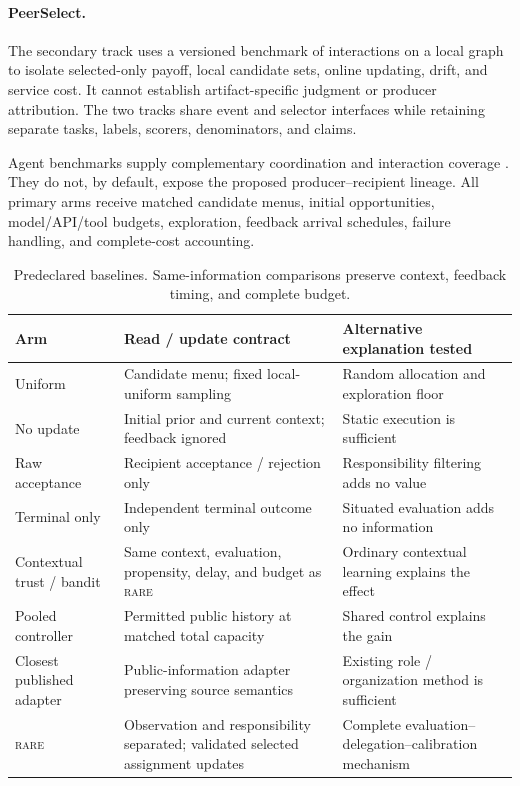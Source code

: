\documentclass[sigconf,anonymous]{aamas}
\newcommand{\rare}{\textsc{rare}}
\begin{document}
\paragraph{PeerSelect.} The secondary track uses a versioned benchmark of interactions on a local graph to isolate selected-only payoff, local candidate sets, online updating, drift, and service cost. It cannot establish artifact-specific judgment or producer attribution. The two tracks share event and selector interfaces while retaining separate tasks, labels, scorers, denominators, and claims.

Agent benchmarks supply complementary coordination and interaction coverage \cite{zhu2025multiagentbench,agashe2025llmcoordination,liu2024agentbench,appworld2024,yao2024taubench}. They do not, by default, expose the proposed producer--recipient lineage. All primary arms receive matched candidate menus, initial opportunities, model/API/tool budgets, exploration, feedback arrival schedules, failure handling, and complete-cost accounting.

\begin{table}[t]
\centering\small
\setlength{\tabcolsep}{3pt}
\begin{tabular}{p{}p{}p{}}
\toprule
Arm & Read / update contract & Alternative explanation tested \\
\midrule
Uniform & Candidate menu; fixed local-uniform sampling & Random allocation and exploration floor \\
No update & Initial prior and current context; feedback ignored & Static execution is sufficient \\
Raw acceptance & Recipient acceptance / rejection only & Responsibility filtering adds no value \\
Terminal only & Independent terminal outcome only & Situated evaluation adds no information \\
Contextual trust / bandit & Same context, evaluation, propensity, delay, and budget as \rare{} & Ordinary contextual learning explains the effect \\
Pooled controller & Permitted public history at matched total capacity & Shared control explains the gain \\
Closest published adapter & Public-information adapter preserving source semantics & Existing role / organization method is sufficient \\
\rare{} & Observation and responsibility separated; validated selected assignment updates & Complete evaluation--delegation--calibration mechanism \\
\bottomrule
\end{tabular}
\caption{Predeclared baselines. Same-information comparisons preserve context, feedback timing, and complete budget.}
\label{tab:baselines}
\end{table}
\end{document}
